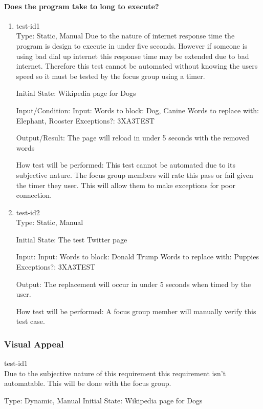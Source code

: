 \documentclass[12pt, titlepage]{article}
\begin{document}
\paragraph{Does the program take to long to execute?}
\begin{enumerate}
\item{test-id1\\}
Type: Static, Manual
 Due to the nature of internet response time the program is design to execute in under five seconds. However if someone is using bad dial up internet this response time may be extended due to bad internet. Therefore this test cannot be automated without knowing the users speed so it must be tested by the focus group using a timer.
					
Initial State: Wikipedia page for Dogs
					
Input/Condition: Input: Words to block: Dog, Canine
Words to replace with: Elephant, Rooster
Exceptions?: 3XA3TEST
					
Output/Result: The page will reload in under 5 seconds with the removed words
					
How test will be performed: This test cannot be automated due to its subjective nature. The focus group members will rate this pass or fail given the timer they user. This will allow them to make exceptions for poor connection.
					
\item{test-id2\\}
Type: Static, Manual
					
Initial State: The test Twitter page
					
Input:
Input:  Words to block: Donald Trump
Words to replace with: Puppies
Exceptions?: 3XA3TEST
					
Output: The replacement will occur in under 5 seconds when timed by the user.
					
How test will be performed: A focus group member will manually verify this test case.
\end{enumerate}
\subsubsection{Visual Appeal}
\item{test-id1\\}
Due to the subjective nature of this requirement this requirement isn't automatable. This will be done with the focus group.

Type: Dynamic, Manual
Initial State: Wikipedia page for Dogs
					
\end{document}
